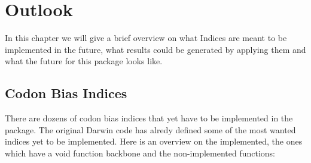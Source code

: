 \chapter{Outlook}
In this chapter we will give a brief overview on what Indices are meant to be implemented in the future, what results could be generated by applying them and what the future for this package looks like. 


\section{Codon Bias Indices}
There are dozens of codon bias indices that yet have to be implemented in the package. The original Darwin code has alredy defined some of the most wanted indices yet to be implemented. 
Here is an overview on the implemented, the ones which have a void function backbone and the non-implemented functions:

